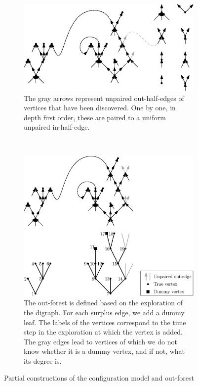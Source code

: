 \begin{figure}
    \begin{subfigure}[htbp]{\textwidth}
        \centering
        \includegraphics[scale=1]{Content/Pictures/configuration_model.eps}
        \caption{The gray arrows represent unpaired out-half-edges of vertices that have been discovered. One by one, in depth first order, these are paired to a uniform unpaired in-half-edge.}
        \label{fig.configuration model}
    \end{subfigure} \\

    \vspace{2em}

    \begin{subfigure}[htbp]{\textwidth}
        \centering
        \includegraphics[scale=1]{Content/Pictures/configuration_model_out_forest.eps}
        \caption{The out-forest is defined based on the exploration of the digraph. For each surplus edge, we add a dummy leaf. The labels of the vertices correspond to the time step in the exploration at which the vertex is added. The gray edges lead to vertices of which we do not know whether it is a dummy vertex, and if not, what its degree is. }
        \label{fig.configuration modeloutforest}
    \end{subfigure}

    \caption{Partial constructions of the configuration model and out-forest}
\end{figure}

